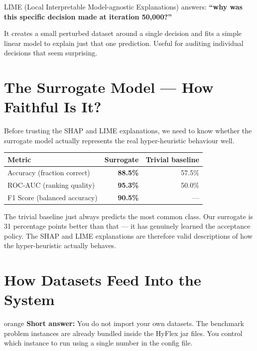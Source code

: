 \documentclass[12pt, a4paper]{article}
\begin{document}
LIME (Local Interpretable Model-agnostic Explanations) answers:
\textbf{``why was this specific decision made at iteration 50,000?''}

It creates a small perturbed dataset around a single decision and fits a simple
linear model to explain just that one prediction. Useful for auditing individual
decisions that seem surprising.

\section{The Surrogate Model --- How Faithful Is It?}

Before trusting the SHAP and LIME explanations, we need to know whether the
surrogate model actually represents the real hyper-heuristic behaviour well.

\vspace{0.3cm}
\begin{center}
\begin{tabularx}{0.85\linewidth}{X r r}
\toprule
\textbf{Metric} & \textbf{Surrogate} & \textbf{Trivial baseline} \\
\midrule
Accuracy (fraction correct) & \textbf{88.5\%} & 57.5\% \\
ROC-AUC (ranking quality) & \textbf{95.3\%} & 50.0\% \\
F1 Score (balanced accuracy) & \textbf{90.5\%} & --- \\
\bottomrule
\end{tabularx}
\end{center}

\vspace{0.3cm}
The trivial baseline just always predicts the most common class. Our surrogate
is 31 percentage points better than that --- it has genuinely learned the
acceptance policy. The SHAP and LIME explanations are therefore valid
descriptions of how the hyper-heuristic actually behaves.

\section{How Datasets Feed Into the System}

\begin{simplebox}{orange}
\textbf{Short answer:} You do not import your own datasets. The benchmark
problem instances are already bundled inside the HyFlex jar files. You
control which instance to run using a single number in the config file.
\end{simplebox}
\end{document}
